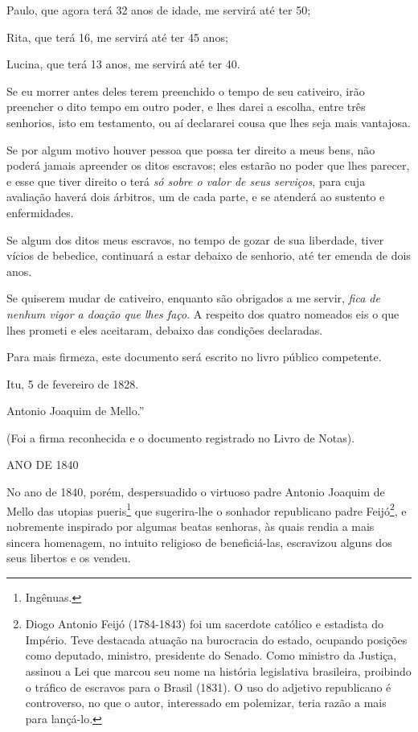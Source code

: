 Paulo, que agora terá 32 anos de idade, me servirá até ter 50;

Rita, que terá 16, me servirá até ter 45 anos;

Lucina, que terá 13 anos, me servirá até ter 40.

Se eu morrer antes deles terem preenchido o tempo de seu cativeiro, irão
preencher o dito tempo em outro poder, e lhes darei a escolha, entre
três senhorios, isto em testamento, ou aí declararei cousa que lhes seja
mais vantajosa.

Se por algum motivo houver pessoa que possa ter direito a meus bens, não
poderá jamais apreender os ditos escravos; eles estarão no poder que
lhes parecer, e esse que tiver direito o terá \emph{só sobre o valor de
seus serviços}, para cuja avaliação haverá dois árbitros, um de cada
parte, e se atenderá ao sustento e enfermidades.

Se algum dos ditos meus escravos, no tempo de gozar de sua liberdade,
tiver vícios de bebedice, continuará a estar debaixo de senhorio, até
ter emenda de dois anos.

Se quiserem mudar de cativeiro, enquanto são obrigados a me servir,
\emph{fica de nenhum vigor a doação que lhes faço}. A respeito dos
quatro nomeados eis o que lhes prometi e eles aceitaram, debaixo das
condições declaradas.

Para mais firmeza, este documento será escrito no livro público
competente.

Itu, 5 de fevereiro de 1828.

Antonio Joaquim de Mello.''

(Foi a firma reconhecida e o documento registrado no Livro de Notas).

ANO DE 1840

No ano de 1840, porém, despersuadido o virtuoso padre Antonio Joaquim de
Mello das utopias pueris\footnote{Ingênuas.} que sugerira-lhe o
sonhador republicano padre Feijó\footnote{Diogo Antonio Feijó
  (1784-1843) foi um sacerdote católico e estadista do Império. Teve
  destacada atuação na burocracia do estado, ocupando posições como
  deputado, ministro, presidente do Senado. Como ministro da Justiça,
  assinou a Lei que marcou seu nome na história legislativa brasileira,
  proibindo o tráfico de escravos para o Brasil (1831). O uso do
  adjetivo republicano é controverso, no que o autor, interessado em
  polemizar, teria razão a mais para lançá-lo.}, e nobremente inspirado
por algumas beatas senhoras, às quais rendia a mais sincera homenagem,
no intuito religioso de beneficiá-las, escravizou alguns dos seus
libertos e os vendeu.

